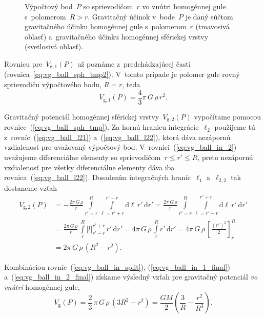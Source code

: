 \documentclass[a4paper, 12pt]{book}
\newcommand{\diff}{\mathrm d}
\newcommand{\gidx}{\mathrm g}
\begin{document}
\begin{figure}
\centering

\caption{Výpočtový bod~$P$ so sprievodičom~$r$ vo vnútri homogénnej gule 
s~polomerom~$R > r$.  Gravitačný účinok v~bode~$P$ je daný súčtom gravitačného 
účinku homogénnej gule s~polomerom~$r$ (tmavosivá oblasť) a~gravitačného účinku 
homogénnej sférickej vrstvy (svetlosivá oblasť).}
\label{fig:homogeneous_ball_in}
\end{figure}

Rovnicu pre~$V_{\gidx,1}(P)$ už poznáme z~predchádzajúcej časti 
(rovnica~\ref{eq:vg_ball_sph_tmp2}).  V~tomto prípade je polomer gule rovný 
sprievodiču výpočtového bodu, $R = r$, teda
%
\begin{equation}
\label{eq:vg_ball_in_1_final}
V_{\gidx,1}(P) = \frac{4}{3} \pi \, G \, \rho \, r^2{.}
\end{equation}

Gravitačný potenciál homogénnej sférickej vrstvy~$V_{\gidx,2}(P)$ vypočítame 
pomocou rovnice~(\ref{eq:vg_ball_sph_tmp}).  Za hornú hranicu 
integrácie~$\ell_2$ použijeme tú z~rovníc~(\ref{eq:vg_ball_l21}) 
a~(\ref{eq:vg_ball_l22}), ktorá dáva nezápornú vzdialenosť pre uvažovaný 
výpočtový bod.  V~rovnici~(\ref{eq:vg_ball_in_2}) uvažujeme diferenciálne 
elementy so sprievodičom~$r \leq r' \leq R$, preto nezápornú vzdialenosť pre 
všetky diferenciálne elementy dáva iba rovnica~(\ref{eq:vg_ball_l22}).  
Dosadením integračných hraníc~$\ell_1$ a~$\ell_{2,2}$ tak dostaneme vzťah
%
\begin{equation}
\label{eq:vg_ball_in_2_final}
\begin{split}
V_{\gidx,2}(P) &= -\frac{2\pi \, G \, \rho}{r} \int\limits_{r' = r}^R 
\int\limits_{\ell = r' + r}^{r' - r} \diff \ell \, r' \, \diff r' = \frac{2\pi 
\, G \, \rho}{r} \int\limits_{r' = r}^R \int\limits_{\ell = r' - r}^{r' + r} 
\diff \ell \, r' \, \diff r'\\
%
&= \frac{2\pi \, G \, \rho}{r} \,  \int\limits_{r}^R \big[ l \big]_{r' - r}^{r' 
+ r} \, r'  \, \diff r' = 4\pi \, G \, \rho \,  \int\limits_{r}^R r'  \, \diff 
r' = 4\pi \, G \, \rho \,  \left[ \frac{(r')^2}{2} \right]_{r}^R\\
%
&= 2\pi \, G \, \rho \,  (R^2 - r^2){.}
\end{split}
\end{equation}

Kombináciou rovníc~(\ref{eq:vg_ball_in_split}), (\ref{eq:vg_ball_in_1_final}) 
a~(\ref{eq:vg_ball_in_2_final}) získame výsledný vzťah pre gravitačný potenciál 
\emph{vo vnútri} homogénnej gule,
%
\begin{equation}
\label{eq:vg_ball_in}
V_\gidx(P) = \frac{2}{3} \, \pi \, G \, \rho \, (3 R^2 - r^2) = \frac{GM}{2} 
\left( \frac{3}{R} - \frac{r^2}{R^3} \right){.}
\end{equation}
\end{document}
